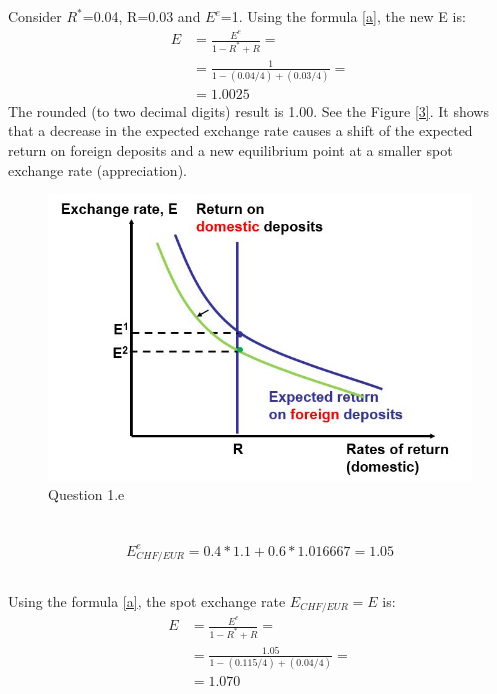 \documentclass[	11pt, ]{fphw}
\begin{document}
\subsection{}
Consider $R^{*}$=0.04, R=0.03 and $E^{e}$=1. 
Using the formula \ref{a}, the new E is: 
\begin{equation} 
\begin{aligned}    
E & = \frac{E^{e}}{1-R^{*}+R} = \\
  & = \frac{ 1 }{ 1- (0.04/4) + (0.03/4) } =\\
  & = 1.0025
\end{aligned} 
\end{equation}
The rounded (to two decimal digits) result is 1.00. See the Figure \vref{3}. It shows that a decrease in the expected exchange rate causes a shift of the expected return on foreign deposits and a new equilibrium point at a smaller spot exchange rate (appreciation). 

\begin{figure}[h] 
\centering 
\includegraphics[scale=0.75]{fige.JPG} 
\caption{Question 1.e} 
\label{3}
\end{figure}

\section{}
\subsection{}
\[ E^{e}_{CHF/EUR}= 0.4 * 1.1 + 0.6 * 1.016667 = 1.05 \]

\subsection{}
Using the formula \ref{a}, the spot exchange rate $E_{CHF/EUR}=E$ is: 
\begin{equation} 
\begin{aligned}    
E & = \frac{E^{e}}{1-R^{*}+R} = \\
  & = \frac{1.05}{ 1- (0.115/4) + (0.04/4) } =\\
  & = 1.070
\end{aligned} 
\end{equation}
\end{document}
